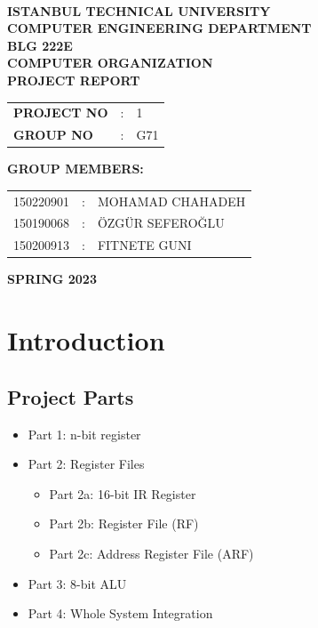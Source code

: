 \documentclass[pdftex,12pt,a4paper]{article}
\begin{document}
\begin{titlepage}
\begin{center}
\textbf{}\\
\textbf{\Large{ISTANBUL TECHNICAL UNIVERSITY}}\\
\vspace{0.5cm}
\textbf{\Large{COMPUTER ENGINEERING DEPARTMENT}}\\
\vspace{2cm}
\textbf{\Large{BLG 222E\\ COMPUTER ORGANIZATION\\ PROJECT REPORT}}\\
\vspace{2.8cm}
\begin{table}[ht]
\centering
\Large{
\begin{tabular}{lcl}
\textbf{PROJECT NO}  & : & 1 \\
\textbf{GROUP NO}  & : & G71 \\
\end{tabular}}
\end{table}
\vspace{1cm}
\textbf{\Large{GROUP MEMBERS:}}\\
\begin{table}[ht]
\centering
\Large{
\begin{tabular}{rcl}
150220901  & : & MOHAMAD CHAHADEH \\
150190068  & : & ÖZGÜR SEFEROĞLU \\
150200913  & : & FITNETE GUNI
\end{tabular}}
\end{table}
\vspace{2.8cm}
\textbf{\Large{SPRING 2023}}

\end{center}

\end{titlepage}

\thispagestyle{empty}
\setcounter{tocdepth}{4}
\tableofcontents
\clearpage

\section{Introduction}

\subsection{Project Parts}
\begin{itemize}
\item Part 1: n-bit register
\item Part 2: Register Files \begin{itemize}
\item Part 2a: 16-bit IR Register
\item Part 2b: Register File (RF)
\item Part 2c: Address Register File (ARF)
\end{itemize}
\item Part 3: 8-bit ALU
\item Part 4: Whole System Integration
\end{itemize}
\end{document}

